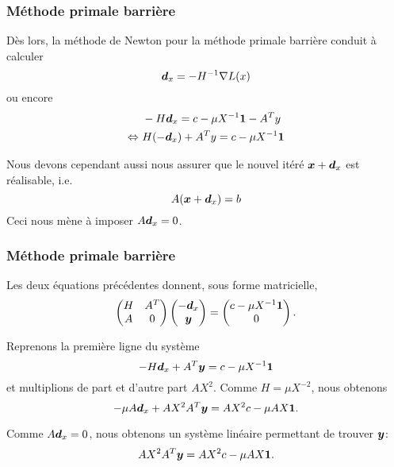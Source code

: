 \documentclass[usepdftitle=false, aspectratio=169]{beamer}
\begin{document}
\begin{frame}
\frametitle{Méthode primale barrière}

Dès lors, la méthode de Newton pour la méthode primale barrière conduit à calculer
$$
{\boldsymbol{d}}_x = - H^{-1}\nabla L(x)
$$
ou encore
\begin{align*}
& -H{\boldsymbol{d}}_x =  c-\mu X^{-1}{\boldsymbol{1}} - A^Ty \\
\Leftrightarrow\  &  H(-{\boldsymbol{d}}_x) + A^Ty =  c-\mu X^{-1}{\boldsymbol{1}}
\end{align*}

\mbox{}

Nous devons cependant aussi nous assurer que le nouvel itéré ${\boldsymbol{x}} + {\boldsymbol{d}}_x$ est réalisable, i.e.
$$
A({\boldsymbol{x}} + {\boldsymbol{d}}_x) =b
$$
Ceci nous mène à imposer $A{\boldsymbol{d}}_x = 0$.

\end{frame}

\begin{frame}
\frametitle{Méthode primale barrière}

Les deux équations précédentes donnent, sous forme matricielle,
$$
\begin{pmatrix}
H & A^T \\
A & 0
\end{pmatrix}
\begin{pmatrix}
-{\boldsymbol{d}}_x \\ {\boldsymbol{y}}
\end{pmatrix}
=
\begin{pmatrix}
c - \mu X^{-1}{\boldsymbol{1}} \\ 0
\end{pmatrix}.
$$

\mbox{}

Reprenons la première ligne du système
$$
-H{\boldsymbol{d}}_x + A^T{\boldsymbol{y}} = c - \mu X^{-1}{\boldsymbol{1}}
$$
et multiplions de part et d'autre part $AX^2$. Comme $H = \mu X^{-2}$, nous obtenons
$$
-\mu A{\boldsymbol{d}}_x + AX^2A^T{\boldsymbol{y}} = AX^2c - \mu AX {\boldsymbol{1}}.
$$


Comme $A{\boldsymbol{d}}_x = 0$, nous obtenons un système linéaire permettant de trouver ${\boldsymbol{y}}$:
$$
AX^2A^T{\boldsymbol{y}} = AX^2c - \mu AX {\boldsymbol{1}}.
$$

\end{frame}
\end{document}
